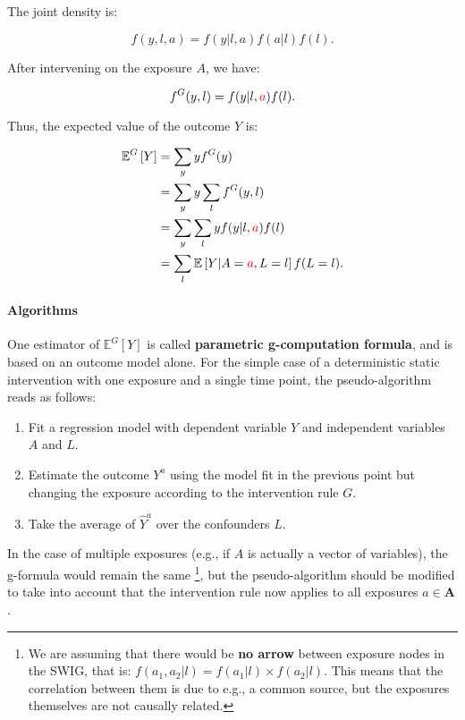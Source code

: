 \documentclass[12pt,twoside]{article}
\begin{document}
The joint density is:

\begin{equation}
    f(y,l,a) = f(y|l,a) f(a|l) f(l).
\end{equation}

After intervening on the exposure $A$, we have:

\begin{equation}
    f^G(y,l) = f(y|l,\textcolor{red}{a}) f(l).
\end{equation}

Thus, the expected value of the outcome $Y$ is:

\begin{align}
    \mathbb{E}^G \left[ Y \right] &= \sum_y y f^G(y) \\
    &= \sum_y y \sum_l f^G(y,l) \\
    &= \sum_y \sum_l y f(y|l,\textcolor{red}{a}) f(l) \\
    &= \sum_l \mathbb{E} \left[ Y|A=\textcolor{red}{a},L=l\right] f(L=l).
\end{align}

\paragraph*{Algorithms}
One estimator of $\mathbb{E}^G [Y]$ is called \textbf{parametric g-computation formula}, and is based on an outcome model alone. For the simple case of a deterministic static intervention with one exposure and a single time point, the pseudo-algorithm reads as follows:

\begin{enumerate}
    \item Fit a regression model with dependent variable $Y$ and independent variables $A$ and $L$.
    \item Estimate the outcome $Y^a$ using the model fit in the previous point but changing the exposure according to the intervention rule $G$.
    \item Take the average of $\hat{Y}^a$ over the confounders $L$.
\end{enumerate}

In the case of multiple exposures (e.g., if $A$ is actually a vector of variables), the g-formula would remain the same \footnote{We are assuming that there would be \textbf{no arrow} between exposure nodes in the SWIG, that is: $f(a_1,a_2|l) = f(a_1|l) \times f(a_2|l)$. This means that the correlation between them is due to e.g., a common source, but the exposures themselves are not causally related.}, but the pseudo-algorithm should be modified to take into account that the intervention rule now applies to all exposures $a \in \mathbf{A}$.
\end{document}
